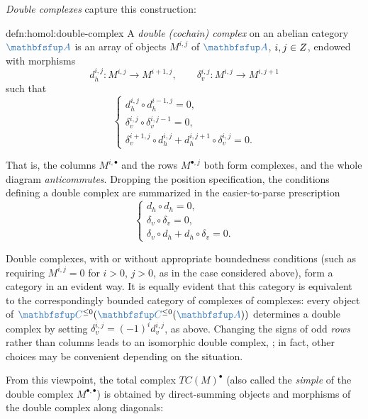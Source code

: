 \emph{Double complexes} capture this construction:

\begin{defn}{}{defn:homol:double-complex}
  A \emph{double (cochain) complex} on an abelian category $\categ{A}$
  is an array of objects $M^{i,j}$ of $\categ{A}$, $i, j \in Z$,
  endowed with morphisms
  \[
    d_h^{i,j} : M^{i,j} \to M^{i+1,j}, \qquad \delta_v^{i,j} : M^{i,j}
    \to M^{i,j+1}
  \]
  such that
  \[
    \begin{cases}
      d_h^{i,j} \circ d_h^{i-1,j} = 0, \\
      \delta_v^{i,j} \circ \delta_v^{i,j-1} = 0, \\
      \delta_v^{i+1,j} \circ d_h^{i,j} + d_h^{i,j+1} \circ
      \delta_v^{i,j} = 0.
    \end{cases}
  \]
\end{defn}

That is, the columns $M^{i,\bullet}$ and the rows $M^{\bullet,j}$ both
form complexes, and the whole diagram \emph{anticommutes}.  Dropping
the position specification, the conditions defining a double complex
are summarized in the easier-to-parse prescription
\[
  \begin{cases}
    d_h \circ d_h = 0, \\
    \delta_v \circ \delta_v = 0, \\
    \delta_v \circ d_h + d_h \circ \delta_v = 0.
  \end{cases}
\]

Double complexes, with or without appropriate boundedness conditions
(such as requiring $M^{i,j} = 0$ for $i > 0$, $j > 0$, as in the case
considered above), form a category in an evident way. It is equally
evident that this category is equivalent to the correspondingly
bounded category of complexes of complexes: every object of
$\categ{C}^{\le 0}(\categ{C}^{\le 0}(\categ{A}))$ determines a double
complex by setting $\delta_v^{i,j} = (-1)^i d_v^{i,j}$, as
above. Changing the signs of odd \emph{rows} rather than columns leads
to an isomorphic double complex,
; in fact,
other choices may be convenient depending on the situation.

From this viewpoint, the total complex $TC(M)^\bullet$ (also called
the \emph{simple} of the double complex $M^{\bullet,\bullet}$) is
obtained by direct-summing objects and morphisms of the double complex
along diagonals:

